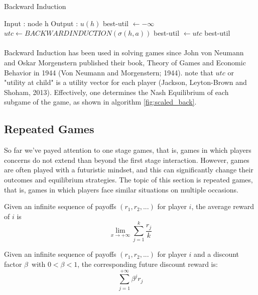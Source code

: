 \begin{algorithm}[h!]
\caption{Backward Induction\label{fig:scaled_back}}
\begin{algorithmic}
 \STATE Input : node h
 \STATE Output : $u(h)$
   
\ENDIF
\STATE best-util $\leftarrow -\infty$ 
\STATE $utc \leftarrow BACKWARDINDUCTION(\sigma(h,a))$  
\STATE best-util $\leftarrow utc$ 
\ENDIF
\ENDFOR
\RETURN best-util
\end{algorithmic}
\end{algorithm}
\paragraph{}Backward Induction has been used in solving games since John von Neumann and Oskar Morgenstern published their book, Theory of Games and Economic Behavior in 1944 (Von Neumann and Morgenstern; 1944). note that $utc$ or "utility at child" is a utility vector for each player (Jackson, Leyton-Brown and Shoham, 2013). Effectively, one determines the Nash Equilibrium of each subgame of the game, as shown in algorithm \ref{fig:scaled_back}.
\\

\subsection{Repeated Games}
So far we've payed attention to one stage games, that  is, games in which players concerns do not extend than beyond the first stage interaction. However, games are often played with a futuristic mindset, and this can significantly change their outcomes and equilibrium strategies. The topic of this section is repeated games, that is, games in which players face similar situations on multiple occasions.
\begin{mydef}\label{def:def666}
Given an infinite sequence of payoffs $(r_1, r_2, ...) $ for player $i$, the average reward of $i$ is
 \begin{equation}
  \lim_{x \to +\infty} \sum_{j=1}^k \frac{r_j}{k}
 \end{equation}	
\end{mydef}
\begin{mydef}\label{def:def777}
Given an infinite sequence of payoffs  $(r_1, r_2, ...) $ for player $i$ and a discount factor $\beta$\ with $ 0 < \beta < 1 $, the corresponding future discount reward is: 
 \begin{equation}\label{eq:777}
 \sum_{j=1}^{+\infty} \beta^j r_j
\end{equation}
\end{mydef}
